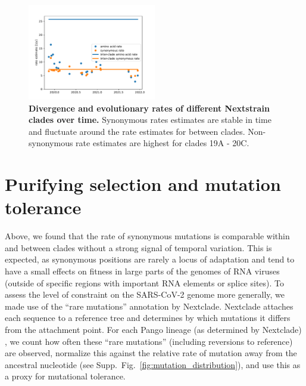 \documentclass[aps,rmp, twocolumn]{revtex4}
\begin{document}
\begin{figure}
    \includegraphics[width=0.5\textwidth]{figures/rate_progression.pdf}
    \caption{{\bf Divergence and evolutionary rates of different Nextstrain clades over time.} Synonymous rates estimates are stable in time and fluctuate around the rate estimates for between clades. Non-synonymous rate estimates are highest for clades 19A - 20C.
    \label{fig:rate_progression} }
\end{figure}




\section*{Purifying selection and mutation tolerance}

Above, we found that the rate of synonymous mutations is comparable within and between clades without a strong signal of temporal variation.
This is expected, as synonymous positions are rarely a locus of adaptation and tend to have a small effects on fitness in large parts of the genomes of RNA viruses \citep{zanini_vivo_2017} (outside of specific regions with important RNA elements or splice sites).
To assess the level of constraint on the SARS-CoV-2 genome more generally, we made use of the ``rare mutations'' annotation by Nextclade.
Nextclade attaches each sequence to a reference tree and determines by which mutations it differs from the attachment point.
For each Pango lineage (as determined by Nextclade) \citep{rambaut_dynamic_2020,aksamentov_nextclade_2021}, we count how often these ``rare mutations'' (including reversions to reference) are observed, normalize this against the relative rate of mutation away from the ancestral nucleotide (see Supp.~Fig.~\ref{fig:mutation_distribution}), and use this as a proxy for mutational tolerance.
\end{document}
